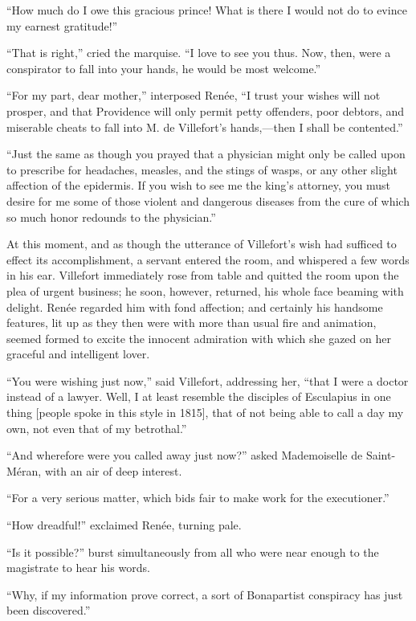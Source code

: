 “How much do I owe this gracious prince! What is there I would not do
to evince my earnest gratitude!”

“That is right,” cried the marquise. “I love to see you thus. Now,
then, were a conspirator to fall into your hands, he would be most
welcome.”

“For my part, dear mother,” interposed Renée, “I trust your wishes will
not prosper, and that Providence will only permit petty offenders, poor
debtors, and miserable cheats to fall into M. de Villefort’s
hands,—then I shall be contented.”

“Just the same as though you prayed that a physician might only be
called upon to prescribe for headaches, measles, and the stings of
wasps, or any other slight affection of the epidermis. If you wish to
see me the king’s attorney, you must desire for me some of those
violent and dangerous diseases from the cure of which so much honor
redounds to the physician.”

At this moment, and as though the utterance of Villefort’s wish had
sufficed to effect its accomplishment, a servant entered the room, and
whispered a few words in his ear. Villefort immediately rose from table
and quitted the room upon the plea of urgent business; he soon,
however, returned, his whole face beaming with delight. Renée regarded
him with fond affection; and certainly his handsome features, lit up as
they then were with more than usual fire and animation, seemed formed
to excite the innocent admiration with which she gazed on her graceful
and intelligent lover.

“You were wishing just now,” said Villefort, addressing her, “that I
were a doctor instead of a lawyer. Well, I at least resemble the
disciples of Esculapius in one thing [people spoke in this style in
1815], that of not being able to call a day my own, not even that of my
betrothal.”

“And wherefore were you called away just now?” asked Mademoiselle de
Saint-Méran, with an air of deep interest.

“For a very serious matter, which bids fair to make work for the
executioner.”

“How dreadful!” exclaimed Renée, turning pale.

“Is it possible?” burst simultaneously from all who were near enough to
the magistrate to hear his words.

“Why, if my information prove correct, a sort of Bonapartist conspiracy
has just been discovered.”

